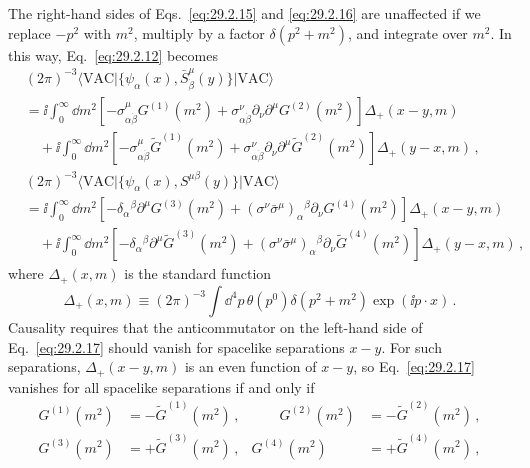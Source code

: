 The right-hand sides of Eqs.~\eqref{eq:29.2.15} and
\eqref{eq:29.2.16} are unaffected if we replace \(-p^2\) with \(m^2\),
multiply by a factor \(\delta(p^2+m^2)\), and integrate over \(m^2\).
In this way, Eq.~\eqref{eq:29.2.12} becomes
\begin{equation}
  \begin{aligned}
  &(2\pi)^{-3}
  \langle\mathrm{VAC}\lvert
    \{\psi_\alpha(x),\bar S^\mu_{\dot\beta}(y)\}
  \rvert\mathrm{VAC}\rangle
  \\
  &=\ii\int_0^\infty \dd m^2
  \left[
    -\sigma^\mu_{\alpha\dot\beta}G^{(1)}(m^2)
    +\sigma^\nu_{\alpha\dot\beta}
      \partial_\nu\partial^\mu G^{(2)}(m^2)
  \right]\Delta_+(x-y,m)
  \\
  &\quad+\ii\int_0^\infty \dd m^2
  \left[
    -\sigma^\mu_{\alpha\dot\beta}\widetilde G^{(1)}(m^2)
    +\sigma^\nu_{\alpha\dot\beta}
      \partial_\nu\partial^\mu\widetilde G^{(2)}(m^2)
  \right]\Delta_+(y-x,m)\,,
  \\
  &(2\pi)^{-3}
  \langle\mathrm{VAC}\lvert
    \{\psi_\alpha(x),S^{\mu\beta}(y)\}
  \rvert\mathrm{VAC}\rangle
  \\
  &=\ii\int_0^\infty \dd m^2
  \left[
    -\delta_\alpha{}^\beta\partial^\mu G^{(3)}(m^2)
    +(\sigma^\nu\bar\sigma^\mu)_\alpha{}^\beta
      \partial_\nu G^{(4)}(m^2)
  \right]\Delta_+(x-y,m)
  \\
  &\quad+\ii\int_0^\infty \dd m^2
  \left[
    -\delta_\alpha{}^\beta\partial^\mu\widetilde G^{(3)}(m^2)
    +(\sigma^\nu\bar\sigma^\mu)_\alpha{}^\beta
      \partial_\nu\widetilde G^{(4)}(m^2)
  \right]\Delta_+(y-x,m)\,,
  \end{aligned}
  \tag{29.2.17}\label{eq:29.2.17}
\end{equation}
where \(\Delta_+(x,m)\) is the standard function
\begin{equation}
  \Delta_+(x,m)
  \equiv
  (2\pi)^{-3}\int \dd^4p\,
  \theta(p^0)\delta(p^2+m^2)\exp(\ii p\mathbin{\cdot}x)\,.
  \tag{29.2.18}\label{eq:29.2.18}
\end{equation}
Causality requires that the anticommutator on the left-hand side of
Eq.~\eqref{eq:29.2.17} should vanish for spacelike separations \(x-y\).
For such separations, \(\Delta_+(x-y,m)\) is an even function of \(x-y\),
so Eq.~\eqref{eq:29.2.17} vanishes for all spacelike separations if and
only if
\begin{equation}
  \begin{aligned}
  G^{(1)}(m^2)&=-\widetilde G^{(1)}(m^2)\,,
  &\qquad
  G^{(2)}(m^2)&=-\widetilde G^{(2)}(m^2)\,,
  \\
  G^{(3)}(m^2)&=+\widetilde G^{(3)}(m^2)\,,
  &
  G^{(4)}(m^2)&=+\widetilde G^{(4)}(m^2)\,,
  \end{aligned}
  \tag{29.2.19}\label{eq:29.2.19}
\end{equation}
